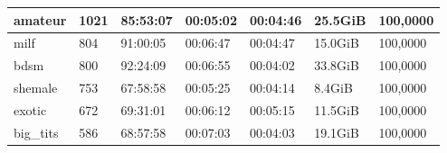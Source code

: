 \begin{table}[]
\begin{tabular}{l|l|l|l|l|l|l}
amateur                                            & 1021                                                & 85:53:07                                                 & 00:05:02                                                & 00:04:46                                               & 25.5GiB                                              & 100,0000                                                      \\ \hline
milf                                               & 804                                                 & 91:00:05                                                 & 00:06:47                                                & 00:04:47                                               & 15.0GiB                                              & 100,0000                                                      \\ \hline
bdsm                                               & 800                                                 & 92:24:09                                                 & 00:06:55                                                & 00:04:02                                               & 33.8GiB                                              & 100,0000                                                      \\ \hline
shemale                                            & 753                                                 & 67:58:58                                                 & 00:05:25                                                & 00:04:14                                               & 8.4GiB                                               & 100,0000                                                      \\ \hline
exotic                                             & 672                                                 & 69:31:01                                                 & 00:06:12                                                & 00:05:15                                               & 11.5GiB                                              & 100,0000                                                      \\ \hline
big\_tits                                          & 586                                                 & 68:57:58                                                 & 00:07:03                                                & 00:04:03                                               & 19.1GiB                                              & 100,0000                                                      \\ \hline

\end{tabular}
\end{table}
